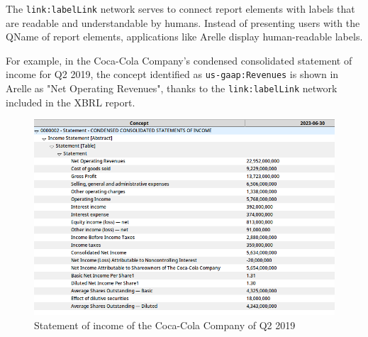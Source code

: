 The \texttt{link:labelLink} network serves to connect report elements with labels that are readable and understandable by humans.
Instead of presenting users with the QName of report elements, applications like Arelle display human-readable labels.

For example, in the Coca-Cola Company's condensed consolidated statement of income for Q2 2019\cite{ko2019q2},
the concept identified as \texttt{us-gaap:Revenues} is shown in Arelle as "Net Operating Revenues",
thanks to the \texttt{link:labelLink} network included in the XBRL report.

\begin{figure}[H]
    \centering
    \includegraphics[width=\textwidth]{images/coca_cola_2019_q2.png}
    \caption{Statement of income of the Coca-Cola Company of Q2 2019}
    \label{fig:coca_cola_2019_q2}
\end{figure}





